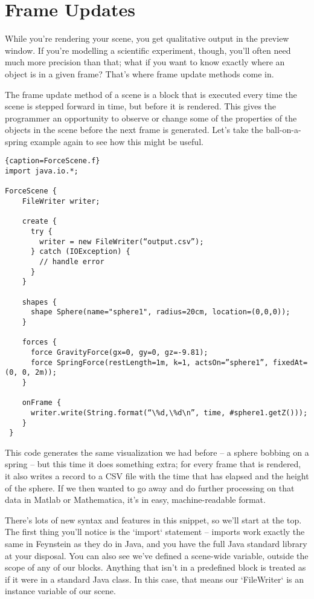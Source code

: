 \documentclass[letterpaper]{article}
\begin{document}
\newpage
\section{Frame Updates}

While you're rendering your scene, you get qualitative output in the
preview window. If you're modelling a scientific experiment, though,
you'll often need much more precision than that; what if you want to
know exactly where an object is in a given frame? That's where frame
update methods come in.

The frame update method of a scene is a block that is executed every
time the scene is stepped forward in time, but before it is
rendered. This gives the programmer an opportunity to observe or
change some of the properties of the objects in the scene before the
next frame is generated. Let's take the ball-on-a-spring example again
to see how this might be useful.

\begin{lstlisting}{caption=ForceScene.f}
import java.io.*;

ForceScene {
    FileWriter writer;

    create {
      try {
        writer = new FileWriter(“output.csv”);
      } catch (IOException) {
        // handle error
      }
    }

    shapes {
      shape Sphere(name="sphere1", radius=20cm, location=(0,0,0));
    }

    forces {
      force GravityForce(gx=0, gy=0, gz=-9.81);
      force SpringForce(restLength=1m, k=1, actsOn=”sphere1”, fixedAt=(0, 0, 2m));
    }

    onFrame {
      writer.write(String.format(“\%d,\%d\n”, time, #sphere1.getZ()));
    }
 }
\end{lstlisting}

This code generates the same visualization we had before -- a sphere
bobbing on a spring -- but this time it does something extra; for
every frame that is rendered, it also writes a record to a CSV file
with the time that has elapsed and the height of the sphere. If we
then wanted to go away and do further processing on that data in
Matlab or Mathematica, it's in easy, machine-readable format.

There's lots of new syntax and features in this snippet, so we'll
start at the top. The first thing you'll notice is the `import`
statement -- imports work exactly the same in Feynstein as they do in
Java, and you have the full Java standard library at your
disposal. You can also see we've defined a scene-wide variable,
outside the scope of any of our blocks. Anything that isn't in a
predefined block is treated as if it were in a standard Java class. In
this case, that means our `FileWriter` is an instance variable of our
scene.
\end{document}
